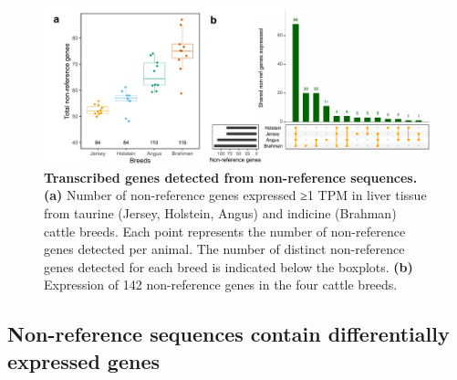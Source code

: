 \documentclass[../main.tex]{subfiles}
\begin{document}
\begin{figure}[!htb]
    \centering
    \includegraphics[width=\textwidth]{paper3/main_figure/Fig3.pdf}
        \caption[Transcribed genes detected from non-reference sequences]{\textbf{Transcribed genes detected from non-reference sequences.} \\
        \footnotesize{\textbf{(a)} Number of non-reference genes expressed ≥1 TPM in liver tissue from taurine (Jersey, Holstein, Angus) and indicine (Brahman) cattle breeds. Each point represents the number of non-reference genes detected per animal. The number of distinct non-reference genes detected for each breed is indicated below the boxplots. \textbf{(b)} Expression of 142 non-reference genes in the four cattle breeds.}}
        \label{fig43:rnanov}
\end{figure}

\subsection*{Non-reference sequences contain differentially expressed genes}
\end{document}

